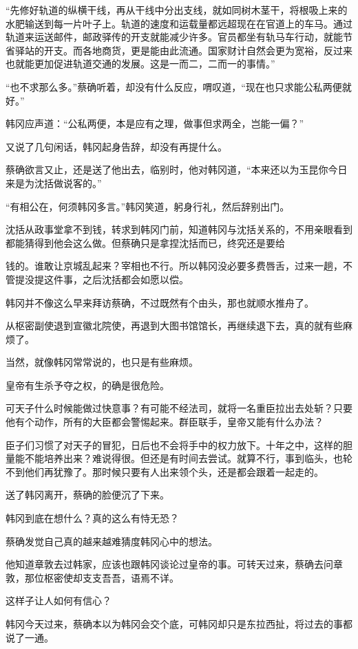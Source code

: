 “先修好轨道的纵横干线，再从干线中分出支线，就如同树木茎干，将根吸上来的水肥输送到每一片叶子上。轨道的速度和运载量都远超现在在官道上的车马。通过轨道来运送邮件，邮政驿传的开支就能减少许多。官员都坐有轨马车行动，就能节省驿站的开支。而各地商货，更是能由此流通。国家财计自然会更为宽裕，反过来也就能更加促进轨道交通的发展。这是一而二，二而一的事情。”

“也不求那么多。”蔡确听着，却没有什么反应，喟叹道，“现在也只求能公私两便就好。”

韩冈应声道：“公私两便，本是应有之理，做事但求两全，岂能一偏？”

又说了几句闲话，韩冈起身告辞，却没有再提什么。

蔡确欲言又止，还是送了他出去，临别时，他对韩冈道，“本来还以为玉昆你今日来是为沈括做说客的。”

“有相公在，何须韩冈多言。”韩冈笑道，躬身行礼，然后辞别出门。

沈括从政事堂拿不到钱，转求到韩冈门前，知道韩冈与沈括关系的，不用亲眼看到都能猜得到他会这么做。但蔡确只是拿捏沈括而已，终究还是要给

钱的。谁敢让京城乱起来？宰相也不行。所以韩冈没必要多费唇舌，过来一趟，不管提没提这件事，之后沈括都会如愿以偿。

韩冈并不像这么早来拜访蔡确，不过既然有个由头，那也就顺水推舟了。

从枢密副使退到宣徽北院使，再退到大图书馆馆长，再继续退下去，真的就有些麻烦了。

当然，就像韩冈常常说的，也只是有些麻烦。

皇帝有生杀予夺之权，的确是很危险。

可天子什么时候能做过快意事？有可能不经法司，就将一名重臣拉出去处斩？只要他有个动作，所有的大臣都会警惕起来。群臣联手，皇帝又能有什么办法？

臣子们习惯了对天子的冒犯，日后也不会将手中的权力放下。十年之中，这样的胆量能不能培养出来？难说得很。但还是有时间去尝试。就算不行，事到临头，也轮不到他们再犹豫了。那时候只要有人出来领个头，还是都会跟着一起走的。

送了韩冈离开，蔡确的脸便沉了下来。

韩冈到底在想什么？真的这么有恃无恐？

蔡确发觉自己真的越来越难猜度韩冈心中的想法。

他知道章敦去过韩家，应该也跟韩冈谈论过皇帝的事。可转天过来，蔡确去问章敦，那位枢密使却支支吾吾，语焉不详。

这样子让人如何有信心？

韩冈今天过来，蔡确本以为韩冈会交个底，可韩冈却只是东拉西扯，将过去的事都说了一通。

